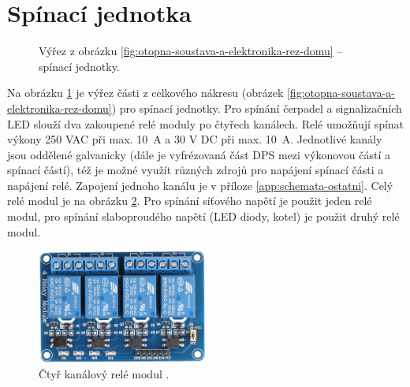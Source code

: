 \section{Spínací jednotka}
\begin{figure}[H]
   \centering
   \def\svgwidth{0.4\columnwidth}
   
    \caption[Výřez pro umístění spínacích jednotek.]{Výřez z obrázku \ref{fig:otopna-soustava-a-elektronika-rez-domu} – spínací jednotky.}
    \label{fig:vyrez-spinaci-jednotka}
\end{figure}
Na obrázku \ref{fig:vyrez-spinaci-jednotka} je výřez části z celkového nákresu (obrázek \ref{fig:otopna-soustava-a-elektronika-rez-domu}) pro spínací jednotky. Pro spínání čerpadel a signalizačních LED slouží dva zakoupené relé moduly po čtyřech kanálech. Relé umožňují spínat výkony 250 VAC při max. 10~A a 30 V DC při max. 10~A. Jednotlivé kanály jsou oddělené galvanicky (dále je vyfrézovaná část DPS mezi výkonovou částí a spínací částí), též je možné využít různých zdrojů pro napájení spínací části a napájení relé. Zapojení jednoho kanálu je v příloze \ref{app:schemata-ostatni}. Celý relé modul je na obrázku \ref{fig:ctyr-kanalovy-rele-modul}. Pro spínání síťového napětí je použit jeden relé modul, pro spínání slaboproudého napětí (LED diody, kotel) je použit druhý relé modul.



\begin{figure}[H]
    \centering
    \includegraphics[width=0.5\textwidth]{images/ctyr-kanalovy-rele-modul.png}
    \caption[Čtyř kanálový relé modul.]{Čtyř kanálový relé modul \cite{ctyr-kanalovy-rele-modul}.}
    \label{fig:ctyr-kanalovy-rele-modul}
\end{figure}